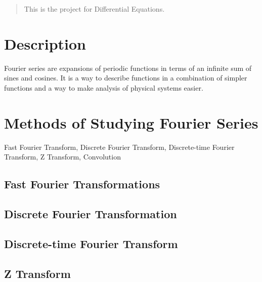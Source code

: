 \documentclass{article}
\newenvironment{AMS}{}{}
\newenvironment{keywords}{}{}
\begin{document}
\newpage
\maketitle
\begin{abstract}
    This is the project for Differential Equations.
\end{abstract}



\section{Description}
Fourier series are expansions of periodic functions in terms of an infinite sum of sines and cosines.
It is a way to describe functions in a combination of simpler functions and
a way to make analysis of physical systems easier.

\section{Methods of Studying Fourier Series}\label{Description}
     Fast Fourier Transform, Discrete Fourier Transform, Discrete-time Fourier Transform, Z Transform, Convolution
     
\subsection{Fast Fourier Transformations}
\subsection{Discrete Fourier Transformation}
\subsection{Discrete-time Fourier Transform}
\subsection{Z Transform}
\end{document}
